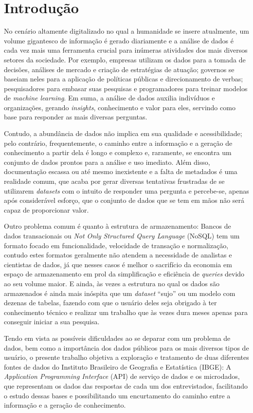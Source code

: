 \chapter{Introdução}

    No cenário altamente digitalizado no qual a humanidade se insere atualmente, um volume gigantesco de informação é gerado diariamente e a análise de dados é cada vez mais uma ferramenta crucial para inúmeras atividades dos mais diversos setores da sociedade. Por exemplo, empresas utilizam os dados para a tomada de decisões, análises de mercado e criação de estratégias de atuação; governos se baseiam neles para a aplicação de políticas públicas e direcionamento de verbas; pesquisadores para embasar suas pesquisas e programadores para treinar modelos de \textit{machine learning}. Em suma, a análise de dados auxilia indivíduos e organizações, gerando \textit{insights}, conhecimento e valor para eles, servindo como base para responder as mais diversas perguntas.

    Contudo, a abundância de dados não implica em sua qualidade e acessibilidade; pelo contrário, frequentemente, o caminho entre a informação e a geração de conhecimento a partir dela é longo e complexo e, raramente, se encontra um conjunto de dados prontos para a análise e uso imediato. Além disso, documentação escassa ou até mesmo inexistente e a falta de metadados é uma realidade comum, que acaba por gerar diversas tentativas frustradas de se utilizarem \textit{datasets} com o intuito de responder uma pergunta e percebe-se, apenas após considerável esforço, que o conjunto de dados que se tem em mãos não será capaz de proporcionar valor.

    Outro problema comum é quanto à estrutura de armazenamento: Bancos de dados transacionais ou \textit{Not Only Structured Query Language} (NoSQL) tem um formato focado em funcionalidade, velocidade de transação e normalização, contudo estes formatos geralmente não atendem a necessidade de analistas e cientistas de dados, já que nesses casos é melhor o sacrifício da economia em espaço de armazenamento em prol da simplificação e eficiência de \textit{queries} devido ao seu volume maior. E ainda, às vezes a estrutura no qual os dados são armazenados é ainda mais inóspita que um \textit{dataset} ``sujo'' ou um modelo com dezenas de tabelas, fazendo com que o usuário deles seja obrigado à ter conhecimento técnico e realizar um trabalho que às vezes dura meses apenas para conseguir iniciar a sua pesquisa.

    Tendo em vista as possíveis dificuldades ao se deparar com um problema de dados, bem como a importância dos dados públicos para os mais diversos tipos de usuário, o presente trabalho objetiva a exploração e tratamento de duas diferentes fontes de dados do Instituto Brasileiro de Geografia e Estatística (IBGE): A \textit{Application Programming Interface} (API) de serviço de dados \cite{API-IBGE} e os microdados, que representam os dados das respostas de cada um dos entrevistados, facilitando o estudo dessas bases e possibilitando um encurtamento do caminho entre a informação e a geração de conhecimento.


